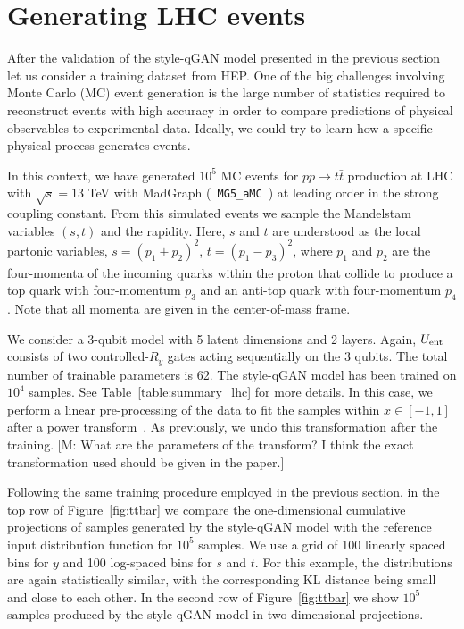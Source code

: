 \documentclass[twocolumn,preprintnumbers,superscriptaddress]{revtex4-2}
\newcommand{\commentMC}[1]{{\color{magenta} {[M: #1]}}}
\begin{document}
\section{Generating LHC events}
\label{sec:lhc}

After the validation of the style-qGAN model presented in the previous section
let us consider a training dataset from HEP. One of the big challenges involving
Monte Carlo (MC) event generation is the large number of statistics required to
reconstruct events with high accuracy in order to compare predictions of
physical observables to experimental data. Ideally, we could try
to learn how a specific physical process generates events.

In this context, we have generated $10^5$ MC events for $pp\rightarrow t\bar{t}$
production at LHC with $\sqrt{s} = 13$ TeV with MadGraph ({\tt
MG5\_aMC}~\cite{Alwall:2014hca,Frederix:2018nkq}) at leading order in the strong coupling constant. From this simulated events we
sample the Mandelstam variables $(s,t)$ and the rapidity. Here, $s$
and $t$ are understood as the local partonic variables,
$s=(p_1^{}+p_2^{})^2$, $t=(p_1^{}-p_3^{})_{}^2$, where $p_1^{}$ and
$p_2^{}$ are the four-momenta of the incoming quarks within the proton that collide to produce a top quark with four-momentum $p_3^{}$ and an anti-top quark with four-momentum $p_4^{}$. Note that all momenta are given in the center-of-mass frame.

We consider a 3-qubit model with 5 latent dimensions and 2 layers. Again,
$U_{\rm ent}$ consists of two controlled-$R_{y}$ gates acting sequentially on
the 3 qubits. The total number of trainable parameters is 62. The style-qGAN
model has been trained on $10^4$ samples. See Table~\ref{table:summary_lhc} for more details. In this case, we perform a linear pre-processing of the data
to fit the samples within $x \in [-1, 1]$ after a power
transform~\cite{yeo2000new}. As previously, we undo this transformation after
the training.
\commentMC{What are the parameters of the transform? I think the exact transformation used should be given in the paper.}

Following the same training procedure employed in the previous section, in the top row of Figure~\ref{fig:ttbar} we compare the one-dimensional cumulative projections of samples generated by the style-qGAN model with the reference input distribution function for $10^5$ samples. We use a grid of 100 linearly spaced bins for $y$ and 100 log-spaced bins for $s$ and $t$.  For this example, the distributions are again statistically similar, with the corresponding KL distance being small and close to each other. In the second row of Figure~\ref{fig:ttbar} we show $10^5$ samples produced by the style-qGAN model in two-dimensional projections.
\end{document}
